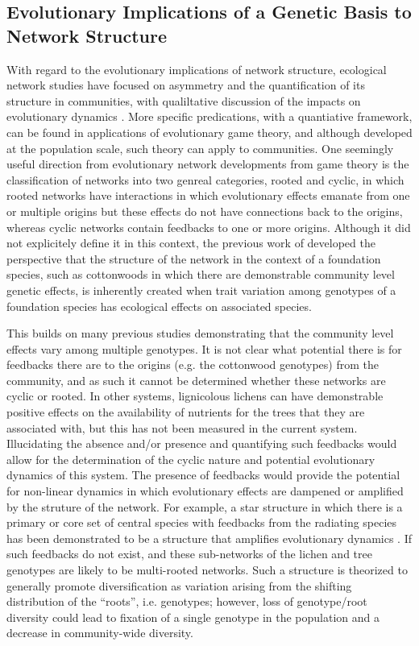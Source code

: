 \documentclass[11pt,twocolumn,twoside,lineno]{pnas-new}
\begin{document}
\subsection*{Evolutionary Implications of a Genetic Basis to Network Structure}

With regard to the evolutionary implications of network structure,
ecological network studies have focused on asymmetry and the
quantification of its structure in communities, with qualiltative
discussion of the impacts on evolutionary dynamics
\cite{Bascompte2006, Diaz-Castelazo2010, Guimaraes2011,
  Thompson2013}. More specific predications, with a quantiative
framework, can be found in applications of evolutionary game theory,
and although developed at the population scale, such theory can apply
to communities. One seemingly useful direction from evolutionary
network developments from game theory is the classification of
networks into two genreal categories, rooted and cyclic, in which
rooted networks have interactions in which evolutionary effects
emanate from one or multiple origins but these effects do not have
connections back to the origins, whereas cyclic networks contain
feedbacks to one or more origins. Although it did not explicitely
define it in this context, the previous work of \citep{Lau2017a}
developed the perspective that the structure of the network in the
context of a foundation species, such as cottonwoods in which there
are demonstrable community level genetic effects, is inherently
created when trait variation among genotypes of a foundation species
has ecological effects on associated species. 

This builds on many previous studies demonstrating that the community
level effects vary among multiple genotypes. It is not clear what
potential there is for feedbacks there are to the origins (e.g. the
cottonwood genotypes) from the community, and as such it cannot be
determined whether these networks are cyclic or rooted. In other
systems, lignicolous lichens can have demonstrable positive effects on
the availability of nutrients for the trees that they are associated
with, but this has not been measured in the current
system. %
Illucidating the absence and/or presence and quantifying such
feedbacks would allow for the determination of the cyclic nature and
potential evolutionary dynamics of this system. The presence of
feedbacks would provide the potential for non-linear dynamics in which
evolutionary effects are dampened or amplified by the struture of the
network. For example, a star structure in which there is a primary or
core set of central species with feedbacks from the radiating species
has been demonstrated to be a structure that amplifies evolutionary
dynamics \cite{Lieberman2005EvolutionaryGraphs}. If such feedbacks do
not exist, and these sub-networks of the lichen and tree genotypes are
likely to be multi-rooted networks. Such a structure is theorized to
generally promote diversification as variation arising from the
shifting distribution of the ``roots'', i.e. genotypes; however, loss
of genotype/root diversity could lead to fixation of a single genotype
in the population and a decrease in community-wide diversity.
\end{document}

